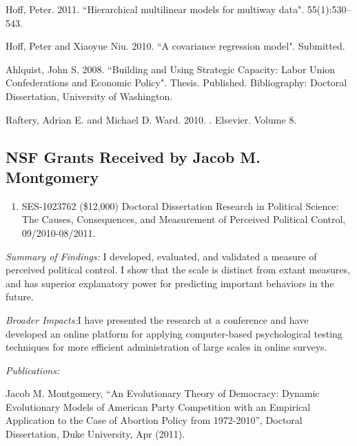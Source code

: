 \documentclass[pdftex,12pt,fullpage,oneside]{amsart}
\begin{document}
\begin{list}{}{\leftmargin=1em}
\item Hoff, Peter. 2011. ``Hierarchical multilinear models for multiway
  data".  55(1):530--543.

\item Hoff, Peter and Xiaoyue Niu. 2010. ``A covariance regression model".  Submitted.


\item  Ahlquist, John S. 2008. ``Building and Using Strategic Capacity: Labor Union Confederations and Economic Policy". Thesis. Published. %
Bibliography: Doctoral Dissertation, University of Washington.

\item  Raftery, Adrian E. and Michael D. Ward. 2010. . %
Elsevier. Volume 8.
\end{list}

 \subsection{NSF Grants Received by Jacob M. Montgomery}
\begin{enumerate}
\item SES-1023762  (\$12,000) Doctoral Dissertation Research in Political Science: The Causes, Consequences, and Measurement of Perceived Political Control, 09/2010-08/2011.    
\end{enumerate}

\textit{Summary of Findings:} I developed, evaluated, and validated a
measure of perceived political control. I show that the scale is
distinct from extant measures, and has superior explanatory power for
predicting important behaviors in the future. 

\textit{Broader Impacts:}I have presented the research at a
conference and have developed an online platform for applying
computer-based psychological testing techniques for more efficient
administration of large scales in online surveys.

\textit{Publications:}

\begin{list}{}{\leftmargin=1em} \small
\item Jacob M. Montgomery, ``An Evolutionary Theory of Democracy:
  Dynamic Evolutionary Models of American Party Competition with an
  Empirical Application to the Case of Abortion Policy from
  1972-2010'', Doctoral Dissertation, Duke University, Apr (2011).
\end{list}
\end{document}
